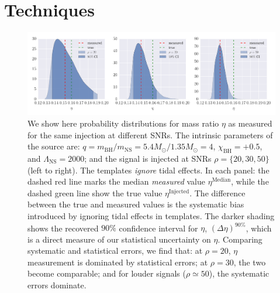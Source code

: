 \documentclass[aps,prd,amsmath,floats,floatfix, twocolumn,
superscriptaddress,nofootinbib,showpacs]{revtex4-1}
\newcommand{\lambdans}{\Lambda_\mathrm{NS}}
\newcommand{\chibh}{\chi_\mathrm{BH}}
\newcommand{\mbh}{m_\mathrm{BH}}
\newcommand{\mns}{m_\mathrm{NS}}
\begin{document}
\section{Techniques}\label{s1:techniques}
\begin{figure}
\centering 
\includegraphics[width=1.8\columnwidth]{plots/SingleSystemEta_q4_0_mc2_25_chi0_50}
\caption{We show here probability distributions for mass ratio $\eta$ as measured
for the same injection at different SNRs. The intrinsic parameters of the source
are: $q = \mbh/\mns = 5.4M_\odot/1.35M_\odot = 4$, $\chibh=+0.5$, and $\lambdans=2000$;
and the signal is injected at SNRs $\rho=\{20,30,50\}$ (left to right). The templates
{\it ignore} tidal effects.
% 
In each panel: the dashed red line marks the median {\it measured} value
$\eta^\mathrm{Median}$, while the dashed green line show the true value
$\eta^\mathrm{Injected}$. The difference between the true and measured values
is the systematic bias introduced
by ignoring tidal effects in templates. The darker shading shows
the recovered $90\%$ confidence interval for $\eta$, $(\Delta\eta)^{90\%}$, 
which is a direct measure of our statistical uncertainty on $\eta$.
% 
Comparing systematic and statistical errors, we find that:
at $\rho=20$, $\eta$ measurement is dominated by statistical
errors; at $\rho=30$, the two become comparable; and 
for louder signals ($\rho\simeq50$), the systematic errors dominate.
}
\label{fig:SingleSystemEtaPDFvsSNR}
\end{figure}
\end{document}
